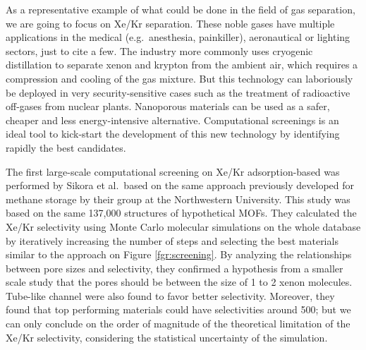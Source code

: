 \documentclass[main.tex]{subfiles}
\begin{document}
As a representative example of what could be done in the field of gas separation, we are going to focus on Xe/Kr separation. These noble gases have multiple applications in the medical (e.g.\ anesthesia, painkiller),\cite{cullen1951anesthetic, holstrater2011intranasal} aeronautical\cite{Patterson_2002,Coxhill_2005} or lighting sectors,\cite{Jarman_1974,Tanaka_2019} just to cite a few. The industry more commonly uses cryogenic distillation to separate xenon and krypton from the ambient air, which requires a compression and cooling of the gas mixture. But this technology can laboriously be deployed in very security-sensitive cases such as the treatment of radioactive off-gases from nuclear plants. Nanoporous materials can be used as a safer, cheaper and less energy-intensive alternative. Computational screenings is an ideal tool to kick-start the development of this new technology by identifying rapidly the best candidates.

The first large-scale computational screening on Xe/Kr adsorption-based was performed by Sikora et al.\ based on the same approach previously developed for methane storage by their group at the Northwestern University.\cite{Sikora_2012} This study was based on the same {137,000} structures of hypothetical MOFs.\cite{Wilmer_2012} They calculated the Xe/Kr selectivity using Monte Carlo molecular simulations on the whole database by iteratively increasing the number of steps and selecting the best materials similar to the approach on Figure \ref{fgr:screening}. By analyzing the relationships between pore sizes and selectivity, they confirmed a hypothesis from a smaller scale study that the pores should be between the size of 1 to 2 xenon molecules.\cite{Ryan_2010} Tube-like channel were also found to favor better selectivity. Moreover, they found that top performing materials could have selectivities around 500; but we can only conclude on the order of magnitude of the theoretical limitation of the Xe/Kr selectivity, considering the statistical uncertainty of the simulation.
\end{document}
